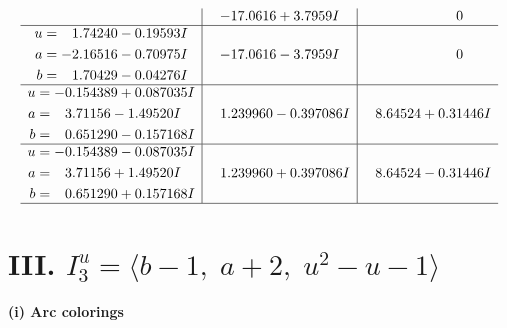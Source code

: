 \documentclass[1p]{elsarticle_modified}
\theoremstyle{definition}
\begin{document}
$$\begin{array}{c|c|c}
 & -17.0616 + 3.7959 I & \phantom{-0.000000 } 0 \\ \hline\begin{aligned}
u &= \phantom{-}1.74240 - 0.19593 I \\
a &= -2.16516 - 0.70975 I \\
b &= \phantom{-}1.70429 - 0.04276 I\end{aligned}
 & -17.0616 - 3.7959 I & \phantom{-0.000000 } 0 \\ \hline\begin{aligned}
u &= -0.154389 + 0.087035 I \\
a &= \phantom{-}3.71156 - 1.49520 I \\
b &= \phantom{-}0.651290 - 0.157168 I\end{aligned}
 & \phantom{-}1.239960 - 0.397086 I & \phantom{-}8.64524 + 0.31446 I \\ \hline\begin{aligned}
u &= -0.154389 - 0.087035 I \\
a &= \phantom{-}3.71156 + 1.49520 I \\
b &= \phantom{-}0.651290 + 0.157168 I\end{aligned}
 & \phantom{-}1.239960 + 0.397086 I & \phantom{-}8.64524 - 0.31446 I\\
 \hline 
 \end{array}$$\newpage\newpage\renewcommand{\arraystretch}{1}
\centering \section*{III. $I^u_{3}= \langle b-1,\;a+2,\;u^2- u-1 \rangle$}
\flushleft \textbf{(i) Arc colorings}\\
\end{document}
